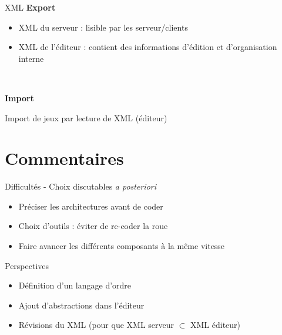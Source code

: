 \documentclass[11pt]{beamer}
\begin{document}
\begin{frame}{XML}
\textbf{Export}
\begin{itemize}
\item XML du serveur : lisible par les serveur/clients
\item XML de l'éditeur : contient des informations d'édition et d'organisation interne
\end{itemize}

~

\textbf{Import}

Import de jeux par lecture de XML (éditeur)

\end{frame}


\section{Commentaires}
\begin{frame}{Difficultés - Choix discutables \textit{a posteriori}}

\begin{itemize}
\item Préciser les architectures avant de coder
\item Choix d'outils : éviter de re-coder la roue
\item Faire avancer les différents composants à la même vitesse
\end{itemize}

\end{frame}


\begin{frame}{Perspectives}
\begin{itemize}
\item Définition d'un langage d'ordre
\item Ajout d'abstractions dans l'éditeur
\item Révisions du XML (pour que XML serveur $\subset$ XML éditeur)
\end{itemize}
\end{frame}
\end{document}
